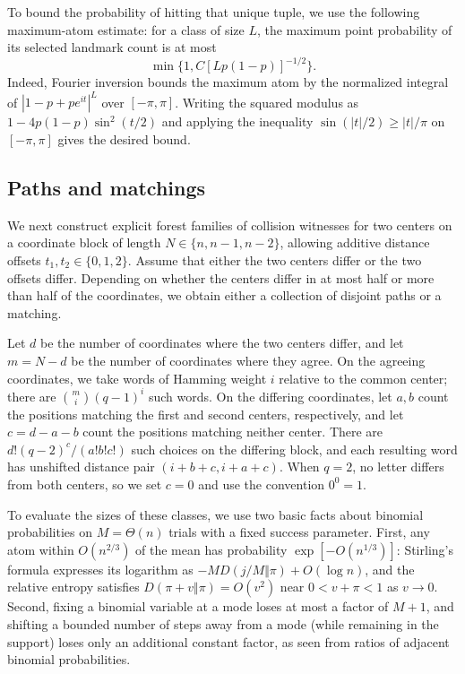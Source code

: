 To bound the probability of hitting that unique tuple, we use the following maximum-atom estimate: for a class of size $L$, the maximum point probability of its selected landmark count is at most
\[
 \min\{1,C[Lp(1-p)]^{-1/2}\}.
\]
Indeed, Fourier inversion bounds the maximum atom by the normalized integral of $|1-p+pe^{it}|^L$ over $[-\pi,\pi]$. Writing the squared modulus as $1-4p(1-p)\sin^2(t/2)$ and applying the inequality $\sin(|t|/2)\ge |t|/\pi$ on $[-\pi,\pi]$ gives the desired bound.

\subsection{Paths and matchings}
We next construct explicit forest families of collision witnesses for two centers on a coordinate block of length $N\in\{n,n-1,n-2\}$, allowing additive distance offsets $t_1,t_2\in\{0,1,2\}$. Assume that either the two centers differ or the two offsets differ. Depending on whether the centers differ in at most half or more than half of the coordinates, we obtain either a collection of disjoint paths or a matching.

Let $d$ be the number of coordinates where the two centers differ, and let $m=N-d$ be the number of coordinates where they agree. On the agreeing coordinates, we take words of Hamming weight $i$ relative to the common center; there are $\binom mi(q-1)^i$ such words. On the differing coordinates, let $a,b$ count the positions matching the first and second centers, respectively, and let $c=d-a-b$ count the positions matching neither center. There are $d!(q-2)^c/(a!b!c!)$ such choices on the differing block, and each resulting word has unshifted distance pair $(i+b+c,i+a+c)$. When $q=2$, no letter differs from both centers, so we set $c=0$ and use the convention $0^0=1$.

To evaluate the sizes of these classes, we use two basic facts about binomial probabilities on $M=\Theta(n)$ trials with a fixed success parameter. First, any atom within $O(n^{2/3})$ of the mean has probability $\exp[-O(n^{1/3})]$: Stirling's formula expresses its logarithm as $-M D(j/M\Vert\pi)+O(\log n)$, and the relative entropy satisfies $D(\pi+v\Vert\pi)=O(v^2)$ near $0<v+\pi<1$ as $v\to0$. Second, fixing a binomial variable at a mode loses at most a factor of $M+1$, and shifting a bounded number of steps away from a mode (while remaining in the support) loses only an additional constant factor, as seen from ratios of adjacent binomial probabilities.

